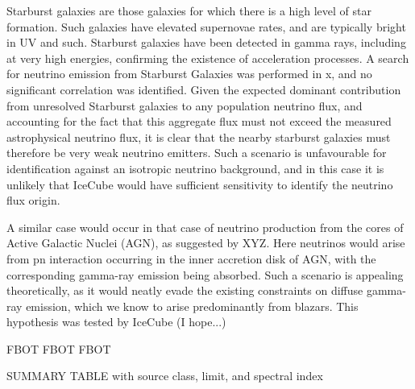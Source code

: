 Starburst galaxies are those galaxies for which there is a high level of star formation. Such galaxies have elevated supernovae rates, and are typically bright in UV and such. Starburst galaxies have been detected in gamma rays, including at very high energies, confirming the existence of acceleration processes. A search for neutrino emission from Starburst Galaxies was performed in x, and no significant correlation was identified. Given the expected dominant contribution from unresolved Starburst galaxies to any population neutrino flux, and accounting for the fact that this aggregate flux must not exceed the measured astrophysical neutrino flux, it is clear that the nearby starburst galaxies must therefore be very weak neutrino emitters. Such a scenario is unfavourable for identification against an isotropic neutrino background, and in this case it is unlikely that IceCube would have sufficient sensitivity to identify the neutrino flux origin.

A similar case would occur in that case of neutrino production from the cores of Active Galactic Nuclei (AGN), as suggested by XYZ. Here neutrinos would arise from pn interaction occurring in the inner accretion disk of AGN, with the corresponding gamma-ray emission being absorbed. Such a scenario is appealing theoretically, as it would neatly evade the existing constraints on diffuse gamma-ray emission, which we know to arise predominantly from blazars. This hypothesis was tested by IceCube (I hope...)

FBOT FBOT FBOT

SUMMARY TABLE with source class, limit, and spectral index